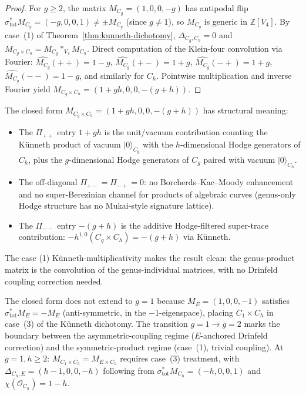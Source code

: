 \begin{proof}[Proof]
For $g \geq 2$, the matrix $M_{C_g} = (1, 0, 0, -g)$ has antipodal flip
$\sigma_{\mathrm{tot}}^* M_{C_g} = (-g, 0, 0, 1) \neq \pm M_{C_g}$
(since $g \neq 1$), so $M_{C_g}$ is generic in
$\mathbb{Z}[V_4]$. By case~(1) of
Theorem~\ref{thm:kunneth-dichotomy}, $\Delta_{C_g, C_h} = 0$ and
$M_{C_g \times C_h} = M_{C_g} *_{V_4} M_{C_h}$. Direct computation
of the Klein-four convolution via Fourier:
$\widehat{M_{C_g}}(++) = 1 - g$, $\widehat{M_{C_g}}(+-) = 1 + g$,
$\widehat{M_{C_g}}(-+) = 1 + g$, $\widehat{M_{C_g}}(--) = 1 - g$, and
similarly for $C_h$. Pointwise multiplication and inverse Fourier
yield $M_{C_g \times C_h} = (1 + g h, 0, 0, -(g + h))$.
\end{proof}

\begin{remark}
\label{rem:genus-product-invariants}
The closed form
$M_{C_g \times C_h} = (1 + gh, 0, 0, -(g + h))$ has structural meaning:
\begin{itemize}
\item The $\Pi_{++}$ entry $1 + gh$ is the unit/vacuum contribution
 counting the K\"unneth product of vacuum $|0\rangle_{C_g}$ with
 the $h$-dimensional Hodge generators of $C_h$, plus the
 $g$-dimensional Hodge generators of $C_g$ paired with vacuum
 $|0\rangle_{C_h}$.
\item The off-diagonal $\Pi_{+-} = \Pi_{-+} = 0$: no
 Borcherds--Kac--Moody enhancement and no super-Berezinian
 channel for products of algebraic curves
 \textup{(}genus-only Hodge structure has no Mukai-style
 signature lattice\textup{).}
\item The $\Pi_{--}$ entry $-(g + h)$ is the additive Hodge-filtered
 super-trace contribution: $-h^{1, 0}(C_g \times C_h)
 = -(g + h)$ via Künneth.
\end{itemize}
The case (1) Künneth-multiplicativity makes the result clean: the
genus-product matrix is the convolution of the genus-individual
matrices, with no Drinfeld coupling correction needed.
\end{remark}

\begin{remark}[Asymmetric coupling at \texorpdfstring{$g = 1$}{g = 1} vs \texorpdfstring{$g \geq 2$}{g >= 2}]
\label{rem:curve-product-genus-one-versus-higher}
The closed form does not extend to $g = 1$ because $M_E = (1, 0, 0, -1)$
satisfies $\sigma_{\mathrm{tot}}^* M_E = -M_E$ (anti-symmetric, in the
$-1$-eigenspace), placing $C_1 \times C_h$ in case~(3) of the
Künneth dichotomy. The transition $g = 1 \to g = 2$ marks the
boundary between the asymmetric-coupling regime
\textup{(}$E$-anchored Drinfeld correction\textup{)} and the
symmetric-product regime \textup{(}case~(1), trivial coupling\textup{).}
At $g = 1, h \geq 2$: $M_{C_1 \times C_h} = M_{E \times C_h}$ requires
case~(3) treatment, with $\Delta_{C_h, E} = (h - 1, 0, 0, -h)$ following
from $\sigma_{\mathrm{tot}}^* M_{C_h} = (-h, 0, 0, 1)$ and
$\chi(\mathcal{O}_{C_h}) = 1 - h$.
\end{remark}

